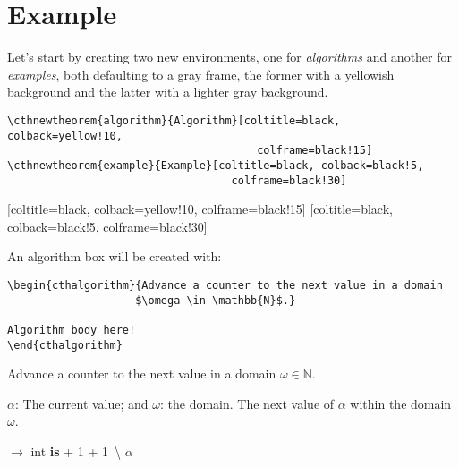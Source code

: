 \documentclass{article}
\begin{document}
\section{Example}
\label{sec:examples}

Let's start by creating two new environments, one for \emph{algorithms} and another for \emph{examples}, both defaulting to a gray frame, the former with a yellowish background and the latter with a lighter gray background.

\begin{verbatim}
\cthnewtheorem{algorithm}{Algorithm}[coltitle=black, colback=yellow!10,
                                       colframe=black!15]
\cthnewtheorem{example}{Example}[coltitle=black, colback=black!5,
                                   colframe=black!30]  
\end{verbatim}

[coltitle=black, colback=yellow!10, colframe=black!15]
[coltitle=black, colback=black!5, colframe=black!30]


An algorithm box will be created with:
\begin{verbatim}
\begin{cthalgorithm}{Advance a counter to the next value in a domain
                    $\omega \in \mathbb{N}$.}

Algorithm body here!
\end{cthalgorithm}
\end{verbatim}

\newcommand{\bracesemptyset}{\ensuremath{\lbrace\,\rbrace}}

\begin{cthalgorithm}{Advance a counter to the next value in a domain $\omega \in \mathbb{N}$.}
  \label{alg:advance1}
\begin{algorithmic}[1]
  \Statex \Input $\alpha$: The current value; and $\omega$: the domain.
  \Statex \Output The next value of $\alpha$ within the domain $\omega$.

  \Vspace

   $\rightarrow$ int \textbf{is}
    \Let {\alpha} {\alpha + 1}
    \While{$\alpha \not\in \omega \And \omega \neq \bracesemptyset$}
      \Let {\alpha} {\alpha + 1}
    \EndWhile
    \If{$\omega \neq \bracesemptyset$}
      \Let {\omega} {\omega \,\backslash \lbrace \alpha \rbrace}
    \EndIf
    \State \Return $\alpha$
  \EndFunction
\end{algorithmic}
\end{cthalgorithm}
\end{document}
